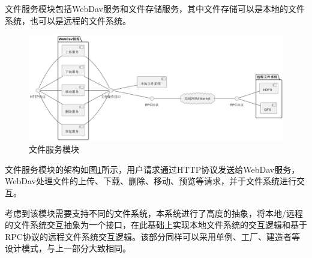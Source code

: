 文件服务模块包括WebDav服务和文件存储服务，其中文件存储可以是本地的文件系统，也可以是远程的文件系统。

\begin{figure}[H]
    \centering
    \includegraphics[scale=0.3]{examples/文件服务模块.png}
    \caption{文件服务模块}
    \label{fig:filesrv}
\end{figure}

文件服务模块的架构如图\ref{fig:filesrv}所示，用户请求通过HTTP协议发送给WebDav服务，WebDav处理文件的上传、下载、删除、移动、预览等请求，并于文件系统进行交互。

考虑到该模块需要支持不同的文件系统，本系统进行了高度的抽象，将本地/远程的文件系统交互抽象为一个接口，在此基础上实现本地文件系统的交互逻辑和基于RPC协议的远程文件系统交互逻辑。该部分同样可以采用单例、工厂、建造者等设计模式，与上一部分大致相同。